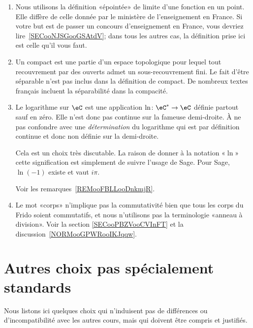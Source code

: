 \begin{enumerate}
	\item
	      Nous utilisons la définition «épointée» de limite d'une fonction en un point. Elle diffère de celle donnée par le ministère de l'enseignement en France. Si votre but est de passer un concours d'enseignement en France, vous devriez lire~\ref{SECooNJSGooGSAtdV}; dans tous les autres cas, la définition prise ici est celle qu'il vous faut.
	\item
	      Un compact est une partie d'un espace topologique pour lequel tout recouvrement par des ouverts admet un sous-recouvrement fini. Le fait d'être séparable n'est pas inclus dans la définition de compact. De nombreux textes français incluent la séparabilité dans la compacité.
	\item
	      Le logarithme sur \( \eC\) est une application \( \ln\colon \eC^*\to \eC\) définie partout sauf en zéro. Elle n'est donc pas continue sur la fameuse demi-droite. À ne pas confondre avec une \emph{détermination} du logarithme qui est par définition continue et donc non définie sur la demi-droite.

	      Cela est un choix très discutable. La raison de donner à la notation «\( \ln\)» cette signification est simplement de suivre l'usage de Sage. Pour Sage, \( \ln(-1)\) existe et vaut \( i\pi\).

	      Voir les remarques~\ref{REMooFBLLooDnkmjR}.
	\item
	      Le mot «corps» n'implique pas la commutativité bien que tous les corps du Frido soient commutatifs, et nous n'utilisons pas la terminologie «anneau à division». Voir la section \ref{SECooPBZVooCVInFT} et la discussion~\ref{NORMooGPWRooIKJqqw}.
\end{enumerate}

\section{Autres choix pas spécialement standards}
\label{SECooINTROchoixPasStandards}

Nous listons ici quelques choix qui n'induisent pas de différences ou d'incompatibilité avec les autres cours, mais qui doivent être compris et justifiés.

